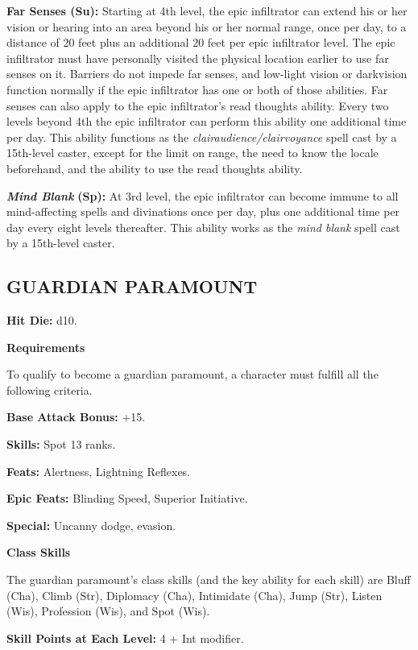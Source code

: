 \documentclass{article}
\begin{document}
\textbf{Far Senses (Su):} Starting at 4th level, the epic infiltrator can extend 
his or her vision or hearing into an area beyond his or her normal range, once 
per day, to a distance of 20 feet plus an additional 20 feet per epic infiltrator 
level. The epic infiltrator must have personally visited the physical location 
earlier to use far senses on it. Barriers do not impede far senses, and low-light 
vision or darkvision function normally if the epic infiltrator has one or both 
of those abilities. Far senses can also apply to the epic infiltrator's read thoughts 
ability. Every two levels beyond 4th the epic infiltrator can perform this ability 
one additional time per day. This ability functions as the \textit{clairaudience/clairvoyance 
}spell cast by a 15th-level caster, except for the limit on range, the need to 
know the locale beforehand, and the ability to use the read thoughts ability. 

\textit{\textbf{Mind Blank }}\textbf{(Sp):} At 3rd level, the epic infiltrator 
can become immune to all mind-affecting spells and divinations once per day, plus 
one additional time per day every eight levels thereafter. This ability works as 
the \textit{mind blank }spell cast by a 15th-level caster. 

\vspace{24pt}
\subsection*{{\LARGE{}GUARDIAN PARAMOUNT }}

\textbf{Hit Die:} d10. 

\textbf{Requirements}

To qualify to become a guardian paramount, a character must fulfill all the following 
criteria. 

\textbf{Base Attack Bonus:} +15. 

\textbf{Skills:} Spot 13 ranks. 

\textbf{Feats:} Alertness, Lightning Reflexes. 

\textbf{Epic Feats:} Blinding Speed, Superior Initiative. 

\textbf{Special:} Uncanny dodge, evasion. 

\textbf{Class Skills}

The guardian paramount's class skills (and the key ability for each skill) are 
Bluff (Cha), Climb (Str), Diplomacy (Cha), Intimidate (Cha), Jump (Str), Listen 
(Wis), Profession (Wis), and Spot (Wis). 

\textbf{Skill Points at Each Level:} 4 + Int modifier. 
\end{document}
